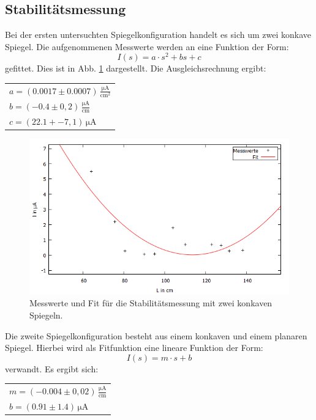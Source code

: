 \subsection{Stabilitätsmessung}
Bei der ersten untersuchten Spiegelkonfiguration handelt es sich um zwei konkave Spiegel. Die aufgenommenen Messwerte werden an eine Funktion der Form:
\begin{equation}
  I(s)=a\cdot s^2+bs+c
\end{equation}
gefittet. Dies ist in Abb. \ref{stabfit1} dargestellt. Die Ausgleichsrechnung ergibt:
\begin{table}[H]
  \centering
\begin{tabular}{l}
 $a=(0.0017 \pm 0.0007)\, \frac{\si{\micro\ampere}}{\si{\centi\meter}^2}$\\
 $b=(-0.4 \pm 0,2)\,  \frac{\si{\micro\ampere}}{\si{\centi\meter}}$   \\
  $c=(22.1+- 7,1)\,  \si{\micro\ampere}$   \\
\end{tabular}
\end{table}
\begin{figure}[H]
  \centering
  \includegraphics[width=14cm]{bilder/konkavkonkav.png}
  \caption{Messwerte und Fit für die Stabilitätsmessung mit zwei konkaven Spiegeln.}
  \label{stabfit1}
\end{figure}
Die zweite Spiegelkonfiguration besteht aus einem konkaven und einem planaren Spiegel. Hierbei wird als Fitfunktion eine lineare Funktion der Form:
\begin{equation}
  I(s)=m\cdot s+b
\end{equation}
verwandt. Es ergibt sich:
\begin{table}
  \centering
\begin{tabular}{l}
  $m=(-0.004 \pm 0,02)\,  \frac{\si{\micro\ampere}}{\si{\centi\meter}}$   \\
 $b=(0.91 \pm 1.4)\,\si{\micro\ampere}$\\
\end{tabular}
\end{table}
